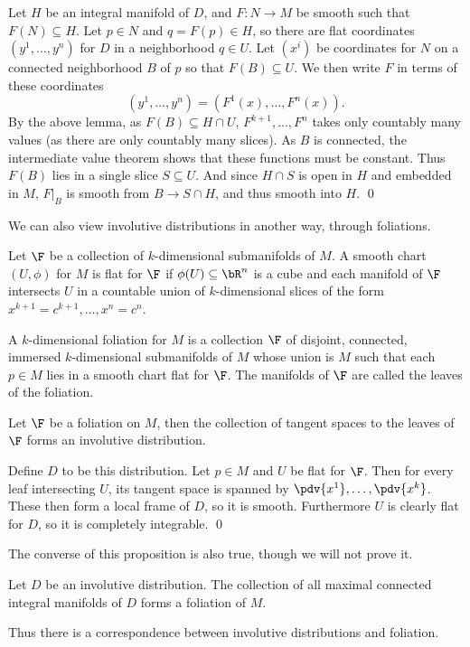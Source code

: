 \ethrm

\bproof

    Let $H$ be an integral manifold of $D$, and $F\colon N\to M$ be smooth such that $F(N)\subseteq H$.
    Let $p\in N$ and $q=F(p)\in H$, so there are flat coordinates $(y^1,\dots,y^n)$ for $D$ in a neighborhood $q\in U$.
    Let $(x^i)$ be coordinates for $N$ on a connected neighborhood $B$ of $p$ so that $F(B)\subseteq U$.
    We then write $F$ in terms of these coordinates
    $$ (y^1,\dots,y^n) = (F^1(x),\dots,F^n(x)) . $$
    By the above lemma, as $F(B)\subseteq H\cap U$, $F^{k+1},\dots,F^n$ takes only countably many values (as there are only countably many slices).
    As $B$ is connected, the intermediate value theorem shows that these functions must be constant.
    Thus $F(B)$ lies in a single slice $S\subseteq U$.
    And since $H\cap S$ is open in $H$ and embedded in $M$, $F|_B$ is smooth from $B\to S\cap H$, and thus smooth into $H$.
    \qed

\eproof

We can also view involutive distributions in another way, through foliations.

\bdefn

    Let $\F$ be a collection of $k$-dimensional submanifolds of $M$.
    A smooth chart $(U,\phi)$ for $M$ is {\emphcolor flat for $\F$} if $\phi(U)\subseteq\bR^n$ is a cube and each manifold of $\F$ intersects $U$ in a countable
    union of $k$-dimensional slices of the form $x^{k+1}=c^{k+1},\dots,x^n=c^n$.

    A $k$-dimensional {\emphcolor foliation} for $M$ is a collection $\F$ of disjoint, connected, immersed $k$-dimensional submanifolds of $M$ whose union is $M$
    such that each $p\in M$ lies in a smooth chart flat for $\F$.
    The manifolds of $\F$ are called the {\emphcolor leaves} of the foliation.

\edefn

\bprop

    Let $\F$ be a foliation on $M$, then the collection of tangent spaces to the leaves of $\F$ forms an involutive distribution.

\eprop

\bproof

    Define $D$ to be this distribution.
    Let $p\in M$ and $U$ be flat for $\F$.
    Then for every leaf intersecting $U$, its tangent space is spanned by $\pdv{x^1},\dots,\pdv{x^k}$.
    These then form a local frame of $D$, so it is smooth.
    Furthermore $U$ is clearly flat for $D$, so it is completely integrable.
    \qed

\eproof

The converse of this proposition is also true, though we will not prove it.

\bthrm[title={Global Frobenius}]

    Let $D$ be an involutive distribution.
    The collection of all maximal connected integral manifolds of $D$ forms a foliation of $M$.

\ethrm

Thus there is a correspondence between involutive distributions and foliation.

